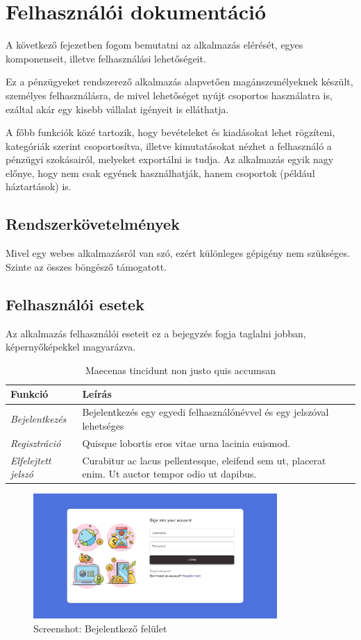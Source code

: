 \chapter{Felhasználói dokumentáció}
\label{ch:user}

A következő fejezetben fogom bemutatni az alkalmazás elérését, egyes komponenseit, illetve felhasználási lehetőségeit. 

Ez a pénzügyeket rendszerező alkalmazás alapvetően magánszemélyeknek készült, személyes felhasználásra, de mivel lehetőséget nyújt csoportos használatra is, ezáltal akár egy kisebb vállalat igényeit is elláthatja.

A főbb funkciók közé tartozik, hogy bevételeket és kiadásokat lehet rögzíteni, kategóriák szerint csoportosítva, illetve kimutatásokat nézhet a felhasználó a pénzügyi szokásairól, melyeket exportálni is tudja. Az alkalmazás egyik nagy előnye, hogy nem csak egyének használhatják, hanem csoportok (például háztartások) is.


\section{Rendszerkövetelmények}

Mivel egy webes alkalmazásról van szó, ezért különleges gépigény nem szükséges. Szinte az összes böngésző támogatott.

\section{Felhasználói esetek}

Az alkalmazás felhasználói eseteit ez a bejegyzés fogja taglalni jobban, képernyőképekkel magyarázva.
\begin{table}[H]
	\centering
	\begin{tabular}{ | m{} | m{} | }
		\hline
		\textbf{Funkció} & \textbf{Leírás} \\
		\hline \hline
		\emph{Bejelentkezés} & Bejelentkezés egy egyedi felhasználónévvel és egy jelszóval lehetséges \\
		\hline
		\emph{Regisztráció} &  Quisque lobortis eros vitae urna lacinia euismod. \\
		\hline
		\emph{Elfelejtett jelszó} & Curabitur ac lacus pellentesque, eleifend sem ut, placerat enim. Ut auctor tempor odio ut dapibus. \\
		\hline
	\end{tabular}
	\caption{Maecenas tincidunt non justo quis accumsan}
	\label{tab:example-1}
\end{table}

\begin{figure}[H]
	\centering
	\includegraphics[height=180px]{img/login-screenshot}
	\caption{Screenshot: Bejelentkező felület}
	\label{fig:example-1}
\end{figure}
